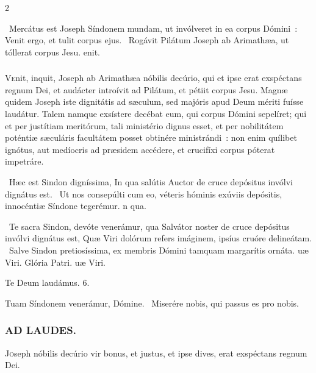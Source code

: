 \documentclass[9pt,twoside]{extarticle}
\begin{document}
\begin{multicols}{2}
\begin{tightlist}{}
\item {}~Mercátus est Joseph Síndonem mundam, ut invólveret in ea corpus Dómini~: \textred{*} Venit ergo, et tulit corpus ejus. ~Rogávit Pilátum Joseph ab Arimathæa, ut tóllerat corpus Jesu. enit.
\end{tightlist}

\subsubsection*{\center {}}
\lettrine{V}enit, inquit, Joseph ab Arimathæa nóbilis decúrio, qui et ipse erat exspéctans regnum Dei, et audácter introívit ad Pilátum, et pétiit corpus Jesu. Magnæ quidem Joseph iste dignitátis ad sæculum, sed majóris apud Deum mériti fuísse laudátur. Talem namque exsístere decébat eum, qui corpus Dómini sepelíret; qui et per justítiam meritórum, tali ministério dignus esset, et per nobilitátem poténtiæ sæculáris facultátem posset obtinére ministrándi~: non enim quílibet ignótus, aut medíocris ad præsidem accédere, et crucifíxi corpus póterat impetráre.

\begin{tightlist}{}
\item {}~Hæc est Sindon digníssima, \textred{*} In qua salútis Auctor de cruce depósitus invólvi dignátus est. ~Ut nos consepúlti cum eo, véteris hóminis exúviis depósitis, innocéntiæ Síndone tegerémur. n qua.
\end{tightlist}

\begin{tightlist}{}
\item {}
\item {}~Te sacra Sindon, devóte venerámur, qua Salvátor noster de cruce depósitus invólvi dignátus est, \textred{*} Quæ Viri dolórum refers imáginem, ipsíus cruóre delineátam. ~Salve Sindon pretiosíssima, ex membris Dómini tamquam margarítis ornáta. uæ Viri. Glória Patri. uæ Viri.
\item Te Deum laudámus. 6.
\item {} Tuam Síndonem venerámur, Dómine. ~Miserére nobis, qui passus es pro nobis.
\end{tightlist}

\subsubsection*{\center \textsc{AD LAUDES.}}
\begin{center}\end{center}
\lettrine{J}oseph nóbilis decúrio vir bonus, et justus, et ipse dives, erat exspéctans regnum Dei.


\end{multicols}
\end{document}
